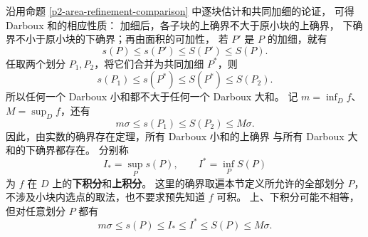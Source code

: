 沿用命题 \ref{p2-area-refinement-comparison} 中逐块估计和共同加细的论证，
可得 Darboux 和的相应性质：
加细后，各子块的上确界不大于原小块的上确界，
下确界不小于原小块的下确界；再由面积的可加性，
若 $P'$ 是 $P$ 的加细，就有
\[
s(P)\le s(P')\le S(P')\le S(P).
\]
任取两个划分 $P_1,P_2$，将它们合并为共同加细 $P^*$，则
\[
s(P_1)\le s(P^*)\le S(P^*)\le S(P_2).
\]
所以任何一个 Darboux 小和都不大于任何一个 Darboux 大和。
记 $m=\inf_D f$、$M=\sup_D f$，还有
\[
m\sigma\le s(P_1)\le S(P_2)\le M\sigma.
\]
因此，由实数的确界存在定理，所有 Darboux 小和的上确界
与所有 Darboux 大和的下确界都存在。
分别称
\[
I_*=\sup_P s(P),\qquad I^*=\inf_P S(P)
\]
为 $f$ 在 $D$ 上的\textbf{下积分}和\textbf{上积分}。
这里的确界取遍本节定义所允许的全部划分 $P$，
不涉及小块内选点的取法，也不要求预先知道 $f$ 可积。
上、下积分可能不相等，但对任意划分 $P$ 都有
\[
m\sigma\le s(P)\le I_*\le I^*\le S(P)\le M\sigma.
\]

